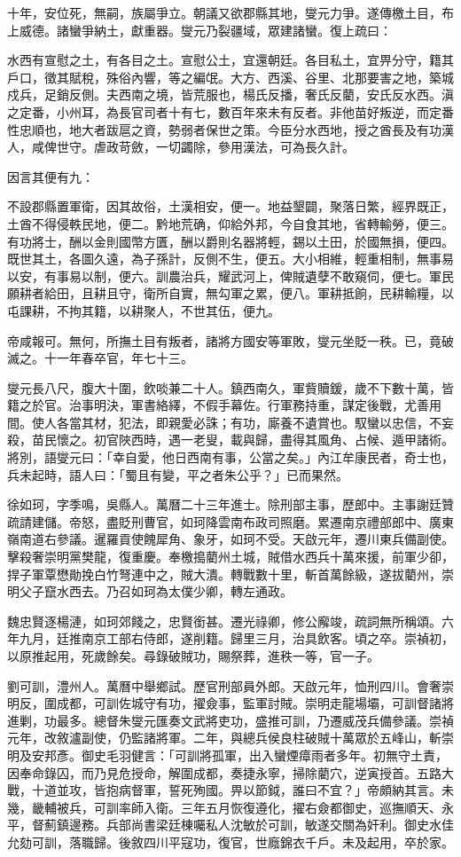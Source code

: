 \begin{pinyinscope}
{{十年，安位死，無嗣，族屬爭立。朝議又欲郡縣其地，燮元力爭。遂傳檄土目，布上威德。諸蠻爭納土，獻重器。燮元乃裂疆域，眾建諸蠻。復上疏曰：

水西有宣慰之土，有各目之土。宣慰公土，宜還朝廷。各目私土，宜畀分守，籍其戶口，徵其賦稅，殊俗內響，等之編氓。大方、西溪、谷里、北那要害之地，築城戍兵，足銷反側。夫西南之境，皆荒服也，楊氏反播，奢氏反藺，安氏反水西。滇之定番，小州耳，為長官司者十有七，數百年來未有反者。非他苗好叛逆，而定番性忠順也，地大者跋扈之資，勢弱者保世之策。今臣分水西地，授之酋長及有功漢人，咸俾世守。虐政苛斂，一切蠲除，參用漢法，可為長久計。

因言其便有九：

不設郡縣置軍衛，因其故俗，土漢相安，便一。地益墾闢，聚落日繁，經界既正，土酋不得侵軼民地，便二。黔地荒确，仰給外邦，今自食其地，省轉輸勞，便三。有功將士，酬以金則國幣方匱，酬以爵則名器將輕，錫以土田，於國無損，便四。既世其土，各圖久遠，為子孫計，反側不生，便五。大小相維，輕重相制，無事易以安，有事易以制，便六。訓農治兵，耀武河上，俾賊遺孽不敢窺伺，便七。軍民願耕者給田，且耕且守，衛所自實，無勾軍之累，便八。軍耕抵餉，民耕輸糧，以屯課耕，不拘其籍，以耕聚人，不世其伍，便九。

帝咸報可。無何，所撫土目有叛者，諸將方國安等軍敗，燮元坐貶一秩。已，竟破滅之。十一年春卒官，年七十三。

燮元長八尺，腹大十圍，飲啖兼二十人。鎮西南久，軍貲贖鍰，歲不下數十萬，皆籍之於官。治事明決，軍書絡繹，不假手幕佐。行軍務持重，謀定後戰，尤善用間。使人各當其材，犯法，即親愛必誅；有功，廝養不遺賞也。馭蠻以忠信，不妄殺，苗民懷之。初官陜西時，遇一老叟，載與歸，盡得其風角、占候、遁甲諸術。將別，語燮元曰：「幸自愛，他日西南有事，公當之矣。」內江牟康民者，奇士也，兵未起時，語人曰：「蜀且有變，平之者朱公乎？」已而果然。

徐如珂，字季鳴，吳縣人。萬曆二十三年進士。除刑部主事，歷郎中。主事謝廷贊疏請建儲。帝怒，盡貶刑曹官，如珂降雲南布政司照磨。累遷南京禮部郎中、廣東嶺南道右參議。暹羅貢使餽犀角、象牙，如珂不受。天啟元年，遷川東兵備副使。擊殺奢崇明黨樊龍，復重慶。奉檄搗藺州土城，賊借水西兵十萬來援，前軍少卻，捍子軍覃懋勛挽白竹弩連中之，賊大潰。轉戰數十里，斬首萬餘級，遂拔藺州，崇明父子竄水西去。乃召如珂為太僕少卿，轉左通政。

魏忠賢逐楊漣，如珂郊餞之，忠賢銜甚。遷光祿卿，修公廨竣，疏詞無所稱頌。六年九月，廷推南京工部右侍郎，遂削籍。歸里三月，治具飲客。頃之卒。崇禎初，以原推起用，死歲餘矣。尋錄破賊功，賜祭葬，進秩一等，官一子。

劉可訓，澧州人。萬曆中舉鄉試。歷官刑部員外郎。天啟元年，恤刑四川。會奢崇明反，圍成都，可訓佐城守有功，擢僉事，監軍討賊。崇明走龍場壩，可訓督諸將進剿，功最多。總督朱燮元匯奏文武將吏功，盛推可訓，乃遷威茂兵備參議。崇禎元年，改敘瀘副使，仍監諸將軍。二年，與總兵侯良柱破賊十萬眾於五峰山，斬崇明及安邦彥。御史毛羽健言：「可訓將孤軍，出入蠻煙瘴雨者多年。初無守土責，因奉命錄囚，而乃見危授命，解圍成都，奏捷永寧，掃除藺穴，逆寅授首。五路大戰，十道並攻，皆抱病督軍，誓死殉國。畀以節鉞，誰曰不宜？」帝頗納其言。未幾，畿輔被兵，可訓率師入衛。三年五月恢復遵化，擢右僉都御史，巡撫順天、永平，督薊鎮邊務。兵部尚書梁廷棟囑私人沈敏於可訓，敏遂交關為奸利。御史水佳允劾可訓，落職歸。後敘四川平寇功，復官，世廕錦衣千戶。未及起用，卒於家。

}}
\end{pinyinscope}
